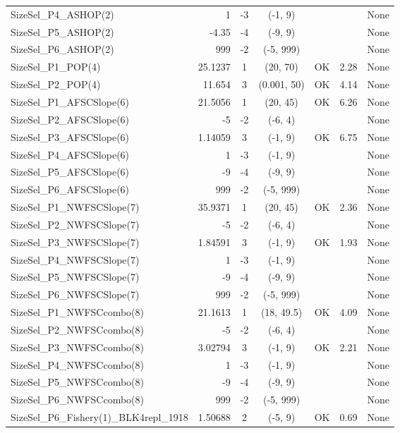 \documentclass[12pt,]{article}
\begin{document}
\begin{landscape}
\begin{longtable}{lrcccll}
  SizeSel\_P4\_ASHOP(2) & 1 & -3 & (-1, 9) &  &  & None \\ 
  SizeSel\_P5\_ASHOP(2) & -4.35 & -4 & (-9, 9) &  &  & None \\ 
  SizeSel\_P6\_ASHOP(2) & 999 & -2 & (-5, 999) &  &  & None \\ 
  SizeSel\_P1\_POP(4) & 25.1237 & 1 & (20, 70) & OK & 2.28 & None \\ 
  SizeSel\_P2\_POP(4) & 11.654 & 3 & (0.001, 50) & OK & 4.14 & None \\ 
  SizeSel\_P1\_AFSCSlope(6) & 21.5056 & 1 & (20, 45) & OK & 6.26 & None \\ 
  SizeSel\_P2\_AFSCSlope(6) & -5 & -2 & (-6, 4) &  &  & None \\ 
  SizeSel\_P3\_AFSCSlope(6) & 1.14059 & 3 & (-1, 9) & OK & 6.75 & None \\ 
  SizeSel\_P4\_AFSCSlope(6) & 1 & -3 & (-1, 9) &  &  & None \\ 
  SizeSel\_P5\_AFSCSlope(6) & -9 & -4 & (-9, 9) &  &  & None \\ 
  SizeSel\_P6\_AFSCSlope(6) & 999 & -2 & (-5, 999) &  &  & None \\ 
  SizeSel\_P1\_NWFSCSlope(7) & 35.9371 & 1 & (20, 45) & OK & 2.36 & None \\ 
  SizeSel\_P2\_NWFSCSlope(7) & -5 & -2 & (-6, 4) &  &  & None \\ 
  SizeSel\_P3\_NWFSCSlope(7) & 1.84591 & 3 & (-1, 9) & OK & 1.93 & None \\ 
  SizeSel\_P4\_NWFSCSlope(7) & 1 & -3 & (-1, 9) &  &  & None \\ 
  SizeSel\_P5\_NWFSCSlope(7) & -9 & -4 & (-9, 9) &  &  & None \\ 
  SizeSel\_P6\_NWFSCSlope(7) & 999 & -2 & (-5, 999) &  &  & None \\ 
  SizeSel\_P1\_NWFSCcombo(8) & 21.1613 & 1 & (18, 49.5) & OK & 4.09 & None \\ 
  SizeSel\_P2\_NWFSCcombo(8) & -5 & -2 & (-6, 4) &  &  & None \\ 
  SizeSel\_P3\_NWFSCcombo(8) & 3.02794 & 3 & (-1, 9) & OK & 2.21 & None \\ 
  SizeSel\_P4\_NWFSCcombo(8) & 1 & -3 & (-1, 9) &  &  & None \\ 
  SizeSel\_P5\_NWFSCcombo(8) & -9 & -4 & (-9, 9) &  &  & None \\ 
  SizeSel\_P6\_NWFSCcombo(8) & 999 & -2 & (-5, 999) &  &  & None \\ 
  SizeSel\_P6\_Fishery(1)\_BLK4repl\_1918 & 1.50688 & 2 & (-5, 9) & OK & 0.69 & None \\ 

\end{longtable}
\end{landscape}
\end{document}
